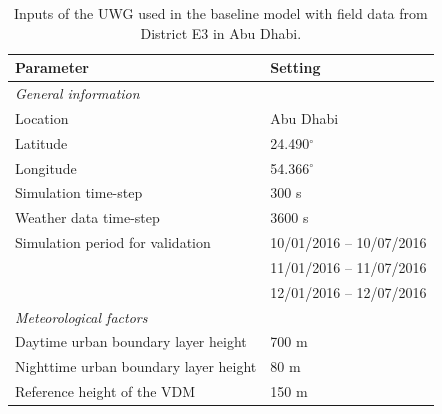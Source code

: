 \begin{table}[]
\footnotesize
\begin{center}
\caption{Inputs of the UWG used in the baseline model with field data from District E3 in Abu Dhabi.}
\label{my-label}
\begin{tabular}{ll}
\toprule
Parameter                                    & Setting                 \\ \hline 
\rule{0pt}{4ex} \textit{General information} \vspace{6pt}                &                         \\
\hspace{12pt}Location                                     & Abu Dhabi               \\
\hspace{12pt}Latitude                                     & 24.490$^{\circ}$                 \\
\hspace{12pt}Longitude                                    & 54.366$^{\circ}$                 \\
\hspace{12pt}Simulation time-step                         & 300 s                   \\
\hspace{12pt}Weather data time-step                       & 3600 s                  \\
\hspace{12pt}Simulation period for validation                            & 10/01/2016 -- 10/07/2016 \\
                                             & 11/01/2016 -- 11/07/2016 \\
                                             & 12/01/2016 -- 12/07/2016 \vspace{6pt} \\
\vspace{6pt}\textit{Meteorological factors}              &                         \\
\hspace{12pt}Daytime urban boundary layer height          & 700 m                   \\
\hspace{12pt}Nighttime urban boundary layer height        & 80 m                    \\
\hspace{12pt}Reference height of the VDM                  & 150 m                   \\

\end{tabular}
\end{center}
\end{table}
